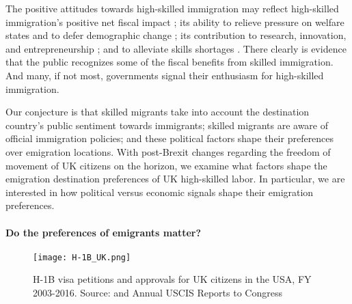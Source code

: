 \documentclass[12pt]{article}
\begin{document}
\par The positive attitudes towards high-skilled immigration may reflect high-skilled immigration's positive net fiscal impact \citep{OECD2014}; its ability to relieve pressure on welfare states and to defer demographic change \citep{Gagnon2014}; its contribution to research, innovation, and entrepreneurship \citep{Hunt2010,Kerr2010,Wadhwa2009}; and to alleviate skills shortages \citep{Chaloff2009}. There clearly is evidence that the public recognizes some of the fiscal benefits from skilled immigration.  And many, if not most, governments signal their enthusiasm for high-skilled immigration.

\par Our conjecture is that skilled migrants take into account the destination country's public sentiment towards immigrants; skilled migrants are aware of official immigration policies; and these political factors shape their preferences over emigration locations.  %
With post-Brexit changes regarding the freedom of movement of UK citizens on the horizon, we examine what factors shape the emigration destination preferences of UK high-skilled labor. In particular, we are interested in how political versus economic signals shape their emigration preferences.



\paragraph{Do the preferences of emigrants matter?} 


\begin{figure}[htb!]
\begin{center}
\texttt{[image: H-1B\_UK.png]}
\caption{H-1B visa petitions and approvals for UK citizens in the USA, FY 2003-2016. Source: \cite{USCIS2017} and Annual USCIS Reports to Congress}\label{fig:migration}
\end{center}
\end{figure}
\end{document}
